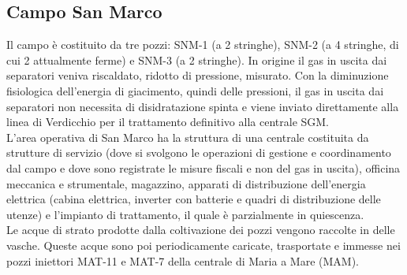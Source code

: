 \subsection{Campo San Marco}
Il campo è costituito da tre pozzi: SNM-1 (a 2 stringhe), SNM-2 (a 4 stringhe, di cui 2 attualmente ferme) e SNM-3 (a 2 stringhe).
In origine il gas in uscita dai separatori veniva riscaldato, ridotto di pressione, misurato. Con la diminuzione fisiologica dell'energia di giacimento, quindi delle pressioni, il gas in uscita dai separatori non necessita di disidratazione spinta e viene inviato direttamente alla linea di Verdicchio per il trattamento definitivo alla centrale SGM.\\
L'area operativa di San Marco ha la struttura di una centrale costituita da strutture di servizio (dove si svolgono le operazioni di gestione e coordinamento dal campo e dove sono registrate le misure fiscali e non del gas in uscita), officina meccanica e strumentale, magazzino, apparati di distribuzione dell'energia elettrica (cabina elettrica, inverter con batterie e quadri di distribuzione delle utenze) e l'impianto di trattamento, il quale è parzialmente in quiescenza.\\
Le acque di strato prodotte dalla coltivazione dei pozzi vengono raccolte in delle vasche. Queste acque sono poi periodicamente caricate, trasportate e immesse nei pozzi iniettori MAT-11 e MAT-7 della centrale di Maria a Mare (MAM).\\
